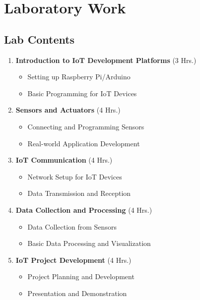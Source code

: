 
\section{Laboratory Work}

\subsection{Lab Contents}
\begin{enumerate}
    \item \textbf{Introduction to IoT Development Platforms} (3 Hrs.)
    \begin{itemize}
        \item Setting up Raspberry Pi/Arduino
        \item Basic Programming for IoT Devices
    \end{itemize}
    \item \textbf{Sensors and Actuators} (4 Hrs.)
    \begin{itemize}
        \item Connecting and Programming Sensors
        \item Real-world Application Development
    \end{itemize}
    \item \textbf{IoT Communication} (4 Hrs.)
    \begin{itemize}
        \item Network Setup for IoT Devices
        \item Data Transmission and Reception
    \end{itemize}
    \item \textbf{Data Collection and Processing} (4 Hrs.)
    \begin{itemize}
        \item Data Collection from Sensors
        \item Basic Data Processing and Visualization
    \end{itemize}
    \item \textbf{IoT Project Development} (4 Hrs.)
    \begin{itemize}
        \item Project Planning and Development
        \item Presentation and Demonstration
    \end{itemize}
\end{enumerate}
